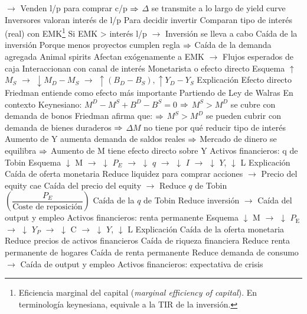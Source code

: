 \documentclass{nuevotema}
\begin{document}
\begin{esquemal}
				\4[] $\to$ Venden l/p para comprar c/p
				\4[] $\Rightarrow$ $\Delta$ se transmite a lo largo de yield curve
				\4 Inversores valoran interés de l/p
				\4[] Para decidir invertir
				\4[] Comparan tipo de interés (real) con EMK\footnote{Eficiencia marginal del capital (\textit{marginal efficiency of capital}). En terminología keynesiana, equivale a la TIR de la inversión. }
				\4[] Si EMK > interés l/p
				\4[] $\to$ Inversión se lleva a cabo
				\4 Caída de la inversión
				\4[] Porque menos proyectos cumplen regla
				\4[] $\Rightarrow$ Caída de la demanda agregada
				\4 Animal spirits
				\4[] Afectan exógenamente a EMK
				\4[] $\to$ Flujos esperados de caja
				\4[] Interaccionan con canal de interés
		\2 Monetarista o efecto directo
			\3 Esquema
				\4[] $\uparrow$ $M_S$ $\to$ $\downarrow M_D - M_S$ $\to$ $\uparrow (B_D - B_S), \uparrow Y_D - Y_S$
			\3 Explicación
				\4 Efecto directo
				\4[] Friedman entiende como efecto más importante
				\4[] Partiendo de Ley de Walras
				\4[] En contexto Keynesiano:
				\4[] $M^D -  M^S + B^D - B^S = 0$
				\4[] $\Rightarrow$ $M^S > M^D$ se cubre con demanda de bonos
				\4[] Friedman afirma que:
				\4[] 
				\4[] $\Rightarrow$ $M^S > M^D$ se pueden cubrir con demanda de bienes duraderos
				\4[] $\Rightarrow$ $\Delta M$ no tiene por qué reducir tipo de interés
				\4[] Aumento de Y aumenta demanda de saldos reales
				\4[] $\Rightarrow$ Mercado de dinero se equilibra
				\4[] $\Rightarrow$ Aumento de M tiene efecto directo sobre Y
		\2 Activos financieros: q de Tobin
			\3 Esquema
				\4[] $\downarrow$ M $\to$ $\downarrow$ $P_E$ $\to$ $\downarrow$ $q$ $\to$ $\downarrow$ $I$ $\to$ $\downarrow$ $Y$, $\downarrow$ L
			\3 Explicación
				\4 Caída de oferta monetaria
				\4[] Reduce liquidez para comprar acciones
				\4[] $\to$ Precio del equity cae
				\4 Caída del precio del equity
				\4[] $\to$ Reduce $q$ de Tobin $\left( \dfrac{P_E}{\text{Coste de reposición}} \right)$
				\4 Caída de la $q$ de Tobin
				\4[] Reduce inversión
				\4[] $\to$ Caída del output y empleo
		\2 Activos financieros: renta permanente
			\3 Esquema
				\4[] $\downarrow$ M $\to$ $\downarrow$ $P_\text{E}$ $\to$ $\downarrow$ $Y_P$ $\to$ $\downarrow$ C $\to$ $\downarrow$ $Y$, $\downarrow$ L
			\3 Explicación
				\4 Caída de la oferta monetaria
				\4[] Reduce precios de activos financieros
				\4 Caída de riqueza financiera
				\4[] Reduce renta permanente de hogares
				\4 Caída de renta permanente
				\4[] Reduce demanda de consumo
				\4[] $\to$ Caída de output y empleo
		\2 Activos financieros: expectativa de crisis

\end{esquemal}
\end{document}
